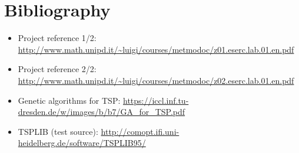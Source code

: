 \renewcommand{\thesection}{A}
\section{Bibliography}
	\begin{itemize}
		\item Project reference 1/2: {\color{blue}\url{http://www.math.unipd.it/~luigi/courses/metmodoc/z01.eserc.lab.01.en.pdf}}
		\item Project reference 2/2: {\color{blue}\url{http://www.math.unipd.it/~luigi/courses/metmodoc/z02.eserc.lab.01.en.pdf}}
		\item Genetic algorithms for TSP:  {\color{blue}\url{https://iccl.inf.tu-dresden.de/w/images/b/b7/GA_for_TSP.pdf}}
		\item TSPLIB (test source):  {\color{blue}\url{http://comopt.ifi.uni-heidelberg.de/software/TSPLIB95/}}
	\end{itemize}
	
